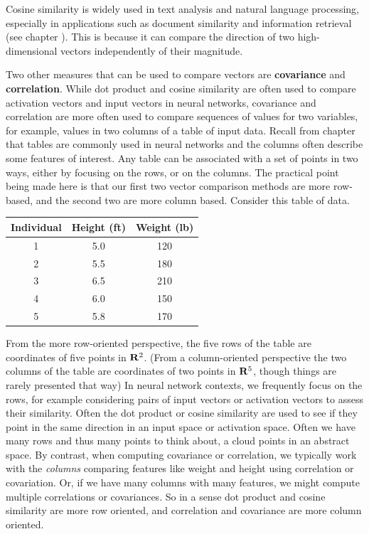    Cosine similarity is widely used in text analysis and natural language 
processing, especially in applications such as document similarity and 
information retrieval (see chapter ). This is 
because it can compare the direction of two high-dimensional vectors independently
of their magnitude. 

   Two other measures that can be used to compare vectors are \textbf{covariance} and \textbf{correlation}. While dot product and cosine similarity are often used to compare activation vectors and input vectors in neural networks, covariance and correlation are more often used to compare sequences of values for two variables, for example, values in two columns of a table of input data. Recall from chapter  that tables 
are commonly used in neural networks and the columns often describe some
features of interest. Any table can be associated with a set of points in two ways, either by focusing on the rows, or on the columns. The practical point being made here is that our first two vector comparison methods are more row-based, and the second two are more column based. Consider this table of data.
\begin{center}
\begin{tabular}{ccc}
\textbf{Individual} & \textbf{Height (ft)} & \textbf{Weight (lb)} \\
\hline
1 & 5.0 & 120 \\
2 & 5.5 & 180 \\
3 & 6.5 & 210 \\
4 & 6.0 & 150 \\
5 & 5.8 & 170 \\
\end{tabular}
\end{center}
From the more row-oriented perspective, the five rows of  the table are coordinates of five points in ${\bf R}^2$. (From a column-oriented perspective the two columns of the table are coordinates of two  points in ${\bf R}^5$, though things are rarely presented that way) In neural network contexts, we frequently focus on the rows, for example considering pairs of input vectors or 
activation vectors to assess their similarity. Often the dot product or cosine 
similarity are used to see if they point in the same direction in an input 
space or activation space. Often we have many rows and thus many points to 
think about, a cloud points in an abstract space. By contrast, when computing 
covariance or correlation, we typically work with the \emph{columns} comparing features like weight and height using correlation or covariation. Or, if we have many columns with many features, we might compute 
multiple correlations or covariances. So in a sense dot product and cosine 
similarity are more row oriented, and correlation and covariance are more 
column oriented.

